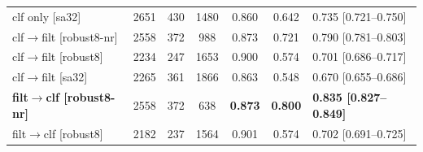 \begin{table}[htbp]
{\begin{tabular}{lcccccl}
        clf only [sa32]              & 2651 & 430 & 1480 & 0.860 & 0.642 & 0.735 [0.721--0.750] \\
        clf$\to$filt [robust8-nr]    & 2558 & 372 & 988 & 0.873 & 0.721 & 0.790 [0.781--0.803] \\
        clf$\to$filt [robust8]       & 2234 & 247 & 1653 & 0.900 & 0.574 & 0.701 [0.686--0.717] \\
        clf$\to$filt [sa32]          & 2265 & 361 & 1866 & 0.863 & 0.548 & 0.670 [0.655--0.686] \\
        \textbf{filt$\to$clf [robust8-nr]} & 2558 & 372 & 638 & \textbf{0.873} & \textbf{0.800} & \textbf{0.835 [0.827--0.849]} \\
        filt$\to$clf [robust8]       & 2182 & 237 & 1564 & 0.901 & 0.574 & 0.702 [0.691--0.725] \\
        \bottomrule
    \end{tabular}}
\end{table}

